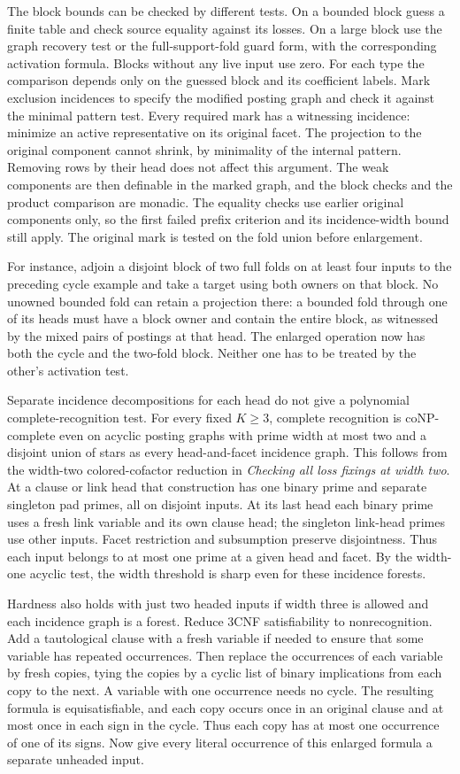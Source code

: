 The block bounds can be checked by different tests. On a
bounded block guess a finite table and check source equality
against its losses. On a large block use the graph recovery
test or the full-support-fold guard form, with the corresponding
activation formula. Blocks without any live input use zero.
For each type the comparison depends only on the guessed
block and its coefficient labels. Mark exclusion incidences
to specify the modified posting graph and check it against
the minimal pattern test. Every required mark has a
witnessing incidence: minimize an active representative on
its original facet. The projection to the original component
cannot shrink, by minimality of the internal pattern.
Removing rows by their head does not affect this argument.
The weak components are then definable in the marked
graph, and the block checks and the product comparison are
monadic. The equality checks use earlier original
components only, so the first failed prefix criterion and
its incidence-width bound still apply. The original mark
is tested on the fold union before enlargement.

For instance, adjoin a disjoint block of two full folds on
at least four inputs to the preceding cycle example and
take a target using both owners on that block. No unowned
bounded fold can retain a projection there: a bounded fold
through one of its heads must have a block owner and
contain the entire block, as witnessed by the mixed pairs
of postings at that head. The enlarged operation now has
both the cycle and the two-fold block. Neither one has to
be treated by the other's activation test.

Separate incidence decompositions for each head do not
give a polynomial complete-recognition test. For every
fixed $K\ge3$, complete recognition is coNP-complete
even on acyclic posting graphs with prime width at
most two and a disjoint union of stars as every
head-and-facet incidence graph. This follows from the
width-two colored-cofactor reduction in
\emph{Checking all loss fixings at width two}.
At a clause or link head that construction has one
binary prime and separate singleton pad primes, all
on disjoint inputs. At its last head each binary
prime uses a fresh link variable and its own clause
head; the singleton link-head primes use other inputs.
Facet restriction and subsumption preserve disjointness.
Thus each input belongs to at most one prime at a
given head and facet. By the width-one acyclic test,
the width threshold is sharp even for these incidence
forests.

Hardness also holds with just two headed inputs if
width three is allowed and each incidence graph is
a forest. Reduce 3CNF satisfiability to nonrecognition. Add a
tautological clause with a fresh variable if needed
to ensure that some variable has repeated occurrences.
Then replace the occurrences of each variable by fresh
copies, tying the copies by a cyclic list of binary
implications from each copy to the next. A variable
with one occurrence needs no cycle. The resulting
formula is equisatisfiable, and each copy occurs
once in an original clause and at most once in
each sign in the cycle. Thus each copy has at most
one occurrence of one of its signs. Now give every
literal occurrence of this enlarged formula a
separate unheaded input.

